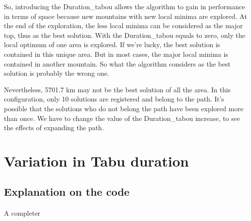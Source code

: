 \documentclass[12pt,oneside,a4paper]{article}
\begin{document}
    So, introducing the Duration\_tabou allows the algorithm to gain in performance in terms of space because new mountains with new local minima are explored. At the end 
    of the exploration, the less local minima can be considered as the major top, thus as the best solution.
    With the Duration\_tabou equals to zero, only the local optimum of one area is explored. If we’re lucky, the best solution is contained in this unique area. But in most cases,
    the major local minima is contained in another mountain. So what the algorithm considers as the best solution is probably the wrong one.

    Nevertheless, 5701.7 km may not be the best solution of all the area. In this configuration, only 10 solutions are registered and belong to the path. It’s possible that
    the solutions who do not belong the path have been explored more than once. We have to change the value of the Duration\_tabou increase, to see the effects of 
    expanding the path.
\newpage
\section{Variation in Tabu duration}
\subsection{Explanation on the code}
\paragraph{}
    A completer
\end{document}
